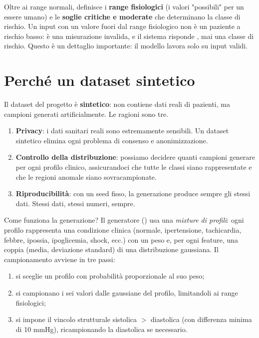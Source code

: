 Oltre ai range normali,  definisce i \textbf{range
fisiologici} (i valori "possibili" per un essere umano) e le \textbf{soglie
critiche e moderate} che determinano la classe di rischio. Un input con un
valore fuori dal range fisiologico non è un paziente a rischio basso: è una
misurazione invalida, e il sistema risponde , mai una classe
di rischio. Questo è un dettaglio importante: il modello lavora solo su
input validi.

\section{Perché un dataset sintetico}\label{sec:perche-dataset-sintetico}

Il dataset del progetto è \textbf{sintetico}: non contiene dati reali di
pazienti, ma campioni generati artificialmente. Le ragioni sono tre.

\begin{enumerate}
  \item \textbf{Privacy}: i dati sanitari reali sono estremamente sensibili.
        Un dataset sintetico elimina ogni problema di consenso e
        anonimizzazione.
  \item \textbf{Controllo della distribuzione}: possiamo decidere quanti
        campioni generare per ogni profilo clinico, assicurandoci che tutte
        le classi siano rappresentate e che le regioni anomale siano
        sovracampionate.
  \item \textbf{Riproducibilità}: con un seed fisso, la generazione produce
        sempre gli stessi dati. Stessi dati, stessi numeri, sempre.
\end{enumerate}

Come funziona la generazione? Il generatore
() usa una \emph{mixture di profili}:
ogni profilo rappresenta una condizione clinica (normale, ipertensione,
tachicardia, febbre, ipossia, ipoglicemia, shock, ecc.) con un peso e, per
ogni feature, una coppia (media, deviazione standard) di una distribuzione
gaussiana. Il campionamento avviene in tre passi:

\begin{enumerate}
  \item si sceglie un profilo con probabilità proporzionale al suo peso;
  \item si campionano i sei valori dalle gaussiane del profilo, limitandoli
        ai range fisiologici;
  \item si impone il vincolo strutturale sistolica $>$ diastolica (con
        differenza minima di 10 mmHg), ricampionando la diastolica se
        necessario.
\end{enumerate}

